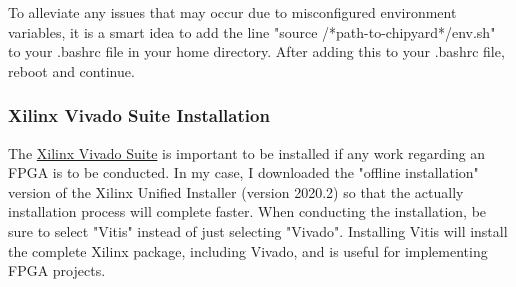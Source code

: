 \documentclass{article}
\begin{document}
	To alleviate any issues that may occur due to misconfigured environment variables, it is a smart idea to add the line "source /*path-to-chipyard*/env.sh" to your .bashrc file in your home directory. After adding this to your .bashrc file, reboot and continue.
	
	\subsubsection{Xilinx Vivado Suite Installation}
	The \hyperref{https://www.xilinx.com/support/download.html}{}{}{Xilinx Vivado Suite} is important to be installed if any work regarding an FPGA is to be conducted. In my case, I downloaded the "offline installation" version of the Xilinx Unified Installer (version 2020.2) so that the actually installation process will complete faster. When conducting the installation, be sure to select "Vitis" instead of just selecting "Vivado". Installing Vitis will install the complete Xilinx package, including Vivado, and is useful for implementing FPGA projects.
	
	
	
	
\end{document}
